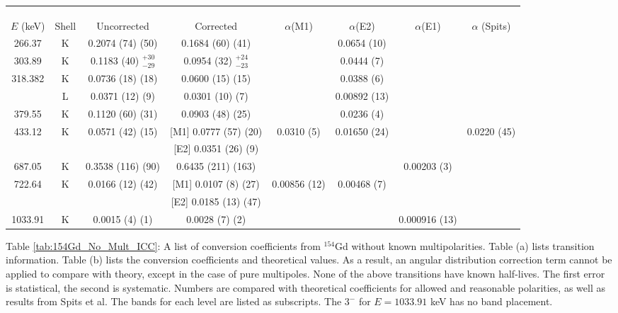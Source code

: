 \begin{landscape}
\begin{table}
    \centering
\begin{ThreePartTable}
    \centering
    \begin{tabular}{>{\footnotesize}c|>{\footnotesize}c|>{\footnotesize}c|>{\footnotesize}c|>{\footnotesize}c|>{\footnotesize}c|>{\footnotesize}c|>{\footnotesize}c}
        \multicolumn{7}{>{\fontsize{12}{15}}c}{TABLE 4.5 (CONTINUED)}\\
        \multicolumn{7}{>{\fontsize{12}{15}}c}{(b)}\\
        \toprule
        &	& \multicolumn{2}{>{\footnotesize}c|}{$\alpha$ (This Work) } & \multicolumn{3}{>{\footnotesize}c|}{Theory\citep{kibedi08:_BRICC}}	& 	\\ 
        $E$ (keV)	& Shell & 	Uncorrected & Corrected 	& $\alpha$(M1) & $\alpha$(E2) & $\alpha$(E1) &	$\alpha$ (Spits)\citep{spits96:_154gd}	\\
	    \hline
	    266.37	& K &	0.2074	(74) (50) & 0.1684 (60) (41) &  & 0.0654 (10) & & \\ \hline
	    303.89	& K &	0.1183	(40) $^{+30}_{-29}$  & 0.0954 (32) $^{+24}_{-23}$ & & 0.0444 (7) & & \\ \hline
	    318.382	& K &	0.0736	(18) (18)  & 0.0600 (15) (15) & & 0.0388 (6) & &\\
	    		& L & 	0.0371	(12) (9) & 0.0301 (10) (7)	& & 0.00892 (13) & &	\\  \hline
	    379.55	& K & 	0.1120	(60) (31) & 0.0903 (48) (25)&  & 0.0236 (4) & & \\ \hline
        433.12	& K &	0.0571	(42) (15) & [M1] 0.0777 (57) (20) & 0.0310 (5) & 0.01650 (24) &	& 0.0220 (45)\\ 
        	&	& & [E2] 0.0351 (26) (9) & & &	& \\ \hline
        687.05	& K & 0.3538 (116) (90) & 0.6435 (211) (163)	& & & 0.00203 (3) &\\ \hline
        722.64	& K		&	0.0166	(12) (42) & [M1] 0.0107 (8) (27)	& 0.00856 (12) & 0.00468 (7) & &		\\
        &	& &  [E2] 0.0185 (13) (47) & & &	& \\ \hline
        1033.91	& K	&	0.0015	(4) (1) & 0.0028 (7) (2)	& & & 0.000916 (13) &	\\
        \bottomrule
    \end{tabular}
\begin{tablenotes}[para]
    Table \ref{tab:154Gd_No_Mult_ICC}: A list of conversion coefficients from $^{154}$Gd without known multipolarities. Table (a) lists transition information. Table (b) lists the conversion coefficients and theoretical values. As a result, an angular distribution correction term cannot be applied to compare with theory, except in the case of pure multipoles. None of the above transitions have known half-lives. The first error is statistical, the second is systematic. Numbers are compared with theoretical coefficients for allowed and reasonable polarities, as well as results from Spits et al. \cite{spits96:_154gd} The bands for each level are listed as subscripts. The $3^-$ for $E=1033.91$ keV has no band placement.

\end{tablenotes}
\end{ThreePartTable}
\end{table}
\end{landscape}
